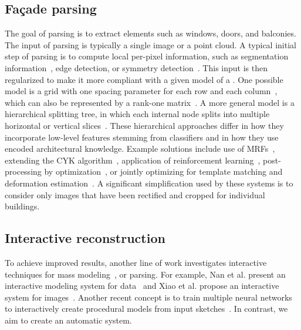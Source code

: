\subsection{Fa\c{c}ade parsing}
% 
The goal of \facade parsing is to extract \facade elements such as windows, doors, and balconies. The input of \facade parsing is typically a single image or a point cloud.
A typical initial step of \facade parsing is to compute local per-pixel information, such as segmentation information~\cite{martinovic2012three}, edge detection, or symmetry detection~\cite{muller2007image}. This  input is then regularized to make it more compliant with a given model of a .
One possible model is a grid with one spacing parameter for each row and each column~\cite{muller2007image},  which can also be represented by a rank-one matrix~\cite{yang2012parsing}.
A more general model is a hierarchical splitting tree, in which each internal node splits into multiple horizontal or vertical slices~\cite{shen2011adaptive,dai2012learning,riemenschneider2012irregular,teboul2013parsing,kozinski2015mrf}. These hierarchical approaches differ in how they incorporate low-level features stemming from  classifiers and in how they use encoded architectural knowledge. Example solutions include use of MRFs~\cite{kozinski2015mrf}, extending the CYK algorithm~\cite{riemenschneider2012irregular},  application of reinforcement learning~\cite{teboul2013parsing}, post-processing by optimization~\cite{martinovic2012three,nan2015template,jiang2016automatic}, or jointly optimizing for template matching and deformation estimation~\cite{duygu:16:cgf}.
A significant simplification used by these systems is to consider only \facade images that have been rectified and cropped for individual buildings.

\pagebreak

\subsection{Interactive reconstruction}
To achieve improved results, another line of work investigates interactive techniques for mass modeling~\cite{debevec1996modeling}, or \facade parsing. For example, Nan et al. present an interactive \facade modeling system for \lidar data~ and Xiao et al. propose an interactive system for images~. Another recent concept is to train multiple neural networks to interactively create procedural models from input sketches~\cite{nishida2016interactive}. In contrast, we aim to create an automatic system.

